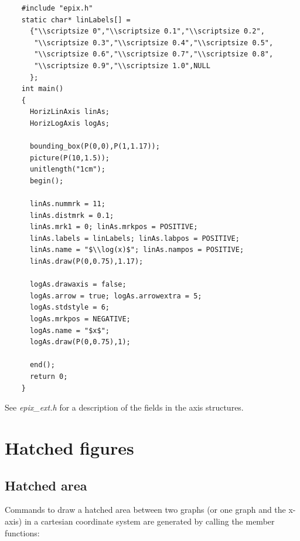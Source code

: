 \documentclass[12pt,a4paper]{article}
\begin{document}
  \begin{lstlisting}
    #include "epix.h"
    static char* linLabels[] =
      {"\\scriptsize 0","\\scriptsize 0.1","\\scriptsize 0.2",
       "\\scriptsize 0.3","\\scriptsize 0.4","\\scriptsize 0.5",
       "\\scriptsize 0.6","\\scriptsize 0.7","\\scriptsize 0.8",
       "\\scriptsize 0.9","\\scriptsize 1.0",NULL
      };
    int main()
    {
      HorizLinAxis linAs;
      HorizLogAxis logAs;

      bounding_box(P(0,0),P(1,1.17));
      picture(P(10,1.5));
      unitlength("1cm");
      begin();

      linAs.nummrk = 11;
      linAs.distmrk = 0.1;
      linAs.mrk1 = 0; linAs.mrkpos = POSITIVE;
      linAs.labels = linLabels; linAs.labpos = POSITIVE;
      linAs.name = "$\\log(x)$"; linAs.nampos = POSITIVE;
      linAs.draw(P(0,0.75),1.17);

      logAs.drawaxis = false;
      logAs.arrow = true; logAs.arrowextra = 5;
      logAs.stdstyle = 6;
      logAs.mrkpos = NEGATIVE;
      logAs.name = "$x$";
      logAs.draw(P(0,0.75),1);

      end();
      return 0;
    }
  \end{lstlisting}

  \begin{minipage}{5.5cm}
    
  \end{minipage}

  See \textit{epix\_ext.h} for a description of the fields in the axis
  structures.

  \section{Hatched figures}

  \subsection{Hatched area}

  Commands to draw a hatched area between two graphs (or one graph and
  the x-axis) in a cartesian coordinate system are generated by
  calling the member functions:
\end{document}
